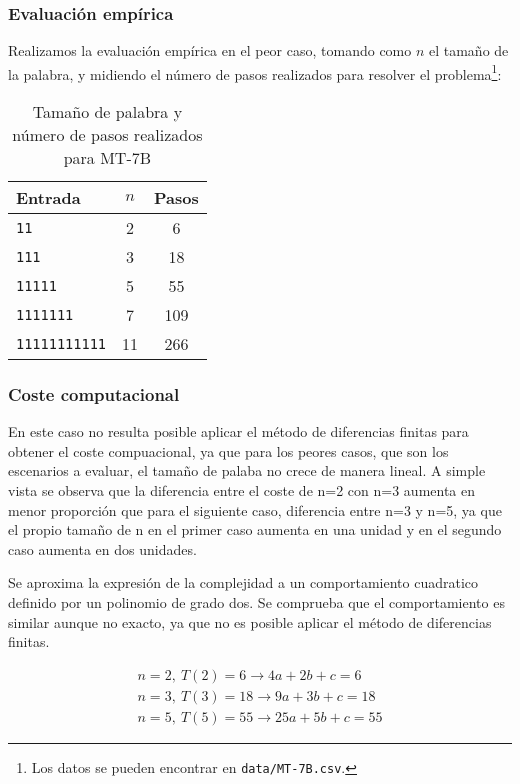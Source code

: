 \subsubsection*{Evaluación empírica}
Realizamos la evaluación empírica en el peor caso, tomando como $n$ el tamaño de la palabra, y midiendo el número de pasos realizados para resolver el problema\footnote{Los datos se pueden encontrar en \texttt{data/MT-7B.csv}.}:

\begin{table}[h]
    \centering
    \begin{tabular}{lcc}
        Entrada & $n$ & Pasos \\
        \hline
        \texttt{11}            &  2  & 6   \\
        \texttt{111}           &  3  & 18  \\
        \texttt{11111}         &  5  & 55  \\
        \texttt{1111111}       &  7  & 109 \\
        \texttt{11111111111}   & 11  & 266 \\
    \end{tabular}
    \caption{Tamaño de palabra y número de pasos realizados para MT-7B}
\end{table}


\subsubsection*{Coste computacional}

En este caso no resulta posible aplicar el método de diferencias finitas para obtener el coste compuacional, ya que para los peores casos, que son los escenarios a evaluar, el tamaño de palaba no crece de manera lineal. A simple vista se observa que la diferencia entre el coste de n=2 con n=3 aumenta en menor proporción que para el siguiente caso, diferencia entre n=3 y n=5, ya que el propio tamaño de n en el primer caso aumenta en una unidad y en el segundo caso aumenta en dos unidades.

Se aproxima la expresión de la complejidad a un comportamiento cuadratico definido por un polinomio de grado dos. Se comprueba que el comportamiento es similar aunque no exacto, ya que no es posible aplicar el método de diferencias finitas.

\begin{subequations}
    \begin{gather}
        n = 2,\ T(2) = 6  \rightarrow 4a  + 2b + c = 6 \\
        n = 3,\ T(3) = 18 \rightarrow 9a  + 3b + c = 18 \\
        n = 5,\ T(5) = 55 \rightarrow 25a + 5b + c = 55
    \end{gather}
\end{subequations}

